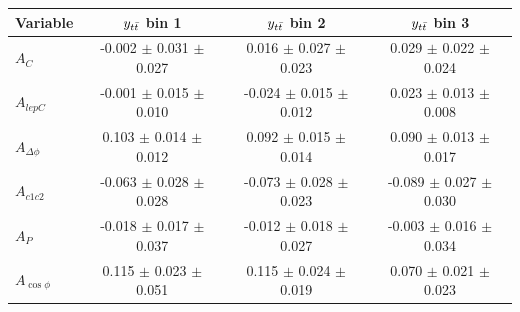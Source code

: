 \begin{table}[hbt]
\begin{center}
\begin{tabular}{l |  c  c  c }
\hline
Variable & $y_{t\bar{t}}$ bin 1 & $y_{t\bar{t}}$ bin 2 & $y_{t\bar{t}}$ bin 3  \\ \hline
$A_{C}$                                 &       -0.002  $\pm$   0.031   $\pm$   0.027   &       0.016   $\pm$   0.027   $\pm$   0.023   &       0.029   $\pm$   0.022   $\pm$   0.024   \\
$A_{lepC}$                              &       -0.001  $\pm$   0.015   $\pm$   0.010   &       -0.024  $\pm$   0.015   $\pm$   0.012   &       0.023   $\pm$   0.013   $\pm$   0.008   \\
$A_{\Delta\phi}$        &       0.103   $\pm$   0.014   $\pm$   0.012   &       0.092   $\pm$   0.015   $\pm$   0.014   &       0.090   $\pm$   0.013   $\pm$   0.017   \\
$A_{c1c2}$                              &       -0.063  $\pm$   0.028   $\pm$   0.028   &       -0.073  $\pm$   0.028   $\pm$   0.023   &       -0.089  $\pm$   0.027   $\pm$   0.030   \\
$A_{P}$                   &       -0.018  $\pm$   0.017   $\pm$   0.037   &       -0.012  $\pm$   0.018   $\pm$   0.027   &       -0.003  $\pm$   0.016   $\pm$   0.034   \\
$A_{\cos\phi}$                              &       0.115   $\pm$   0.023   $\pm$   0.051   &       0.115   $\pm$   0.024   $\pm$   0.019   &       0.070   $\pm$   0.021   $\pm$   0.023   \\
 \hline


\end{tabular}
\end{center}
\end{table}

